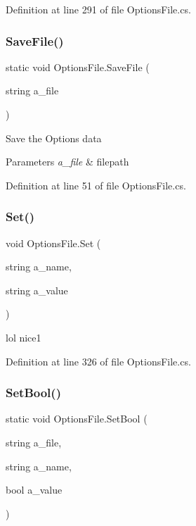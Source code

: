 Definition at line 291 of file Options\+File.\+cs.

\mbox{\label{class_options_file_a4c4f2e244de41428463e563442387223}} 
\subsubsection{\texorpdfstring{Save\+File()}{SaveFile()}}
{\footnotesize\ttfamily static void Options\+File.\+Save\+File (\begin{DoxyParamCaption}\item[{string}]{a\+\_\+file }\end{DoxyParamCaption})\hspace{0.3cm}{\ttfamily [static]}}



Save the Options data 


\begin{DoxyParams}{Parameters}
{\em a\+\_\+file} & filepath\\
\hline
\end{DoxyParams}


Definition at line 51 of file Options\+File.\+cs.

\mbox{\label{class_options_file_a443990c9593d5856b6c5b6f6bec9e9dd}} 
\subsubsection{\texorpdfstring{Set()}{Set()}}
{\footnotesize\ttfamily void Options\+File.\+Set (\begin{DoxyParamCaption}\item[{string}]{a\+\_\+name,  }\item[{string}]{a\+\_\+value }\end{DoxyParamCaption})}

lol nice1  

Definition at line 326 of file Options\+File.\+cs.

\mbox{\label{class_options_file_aff17602090f1d2948aef17426a862356}} 
\subsubsection{\texorpdfstring{Set\+Bool()}{SetBool()}}
{\footnotesize\ttfamily static void Options\+File.\+Set\+Bool (\begin{DoxyParamCaption}\item[{string}]{a\+\_\+file,  }\item[{string}]{a\+\_\+name,  }\item[{bool}]{a\+\_\+value }\end{DoxyParamCaption})\hspace{0.3cm}{\ttfamily [static]}}



